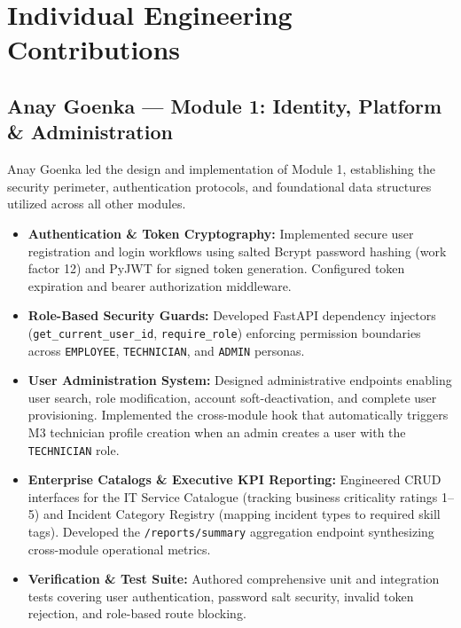 \documentclass[11pt,a4paper,oneside]{report}
\begin{document}
\section{Individual Engineering Contributions}
\label{sec:team_contributions}

\subsection{Anay Goenka --- Module 1: Identity, Platform \& Administration}
\label{subsec:contrib_anay}
Anay Goenka led the design and implementation of Module 1, establishing the security perimeter, authentication protocols, and foundational data structures utilized across all other modules.
\begin{itemize}
    \item \textbf{Authentication \& Token Cryptography:} Implemented secure user registration and login workflows using salted Bcrypt password hashing (work factor 12) and PyJWT for signed token generation. Configured token expiration and bearer authorization middleware.
    \item \textbf{Role-Based Security Guards:} Developed FastAPI dependency injectors (\texttt{get\_current\_user\_id}, \texttt{require\_role}) enforcing permission boundaries across \texttt{EMPLOYEE}, \texttt{TECHNICIAN}, and \texttt{ADMIN} personas.
    \item \textbf{User Administration System:} Designed administrative endpoints enabling user search, role modification, account soft-deactivation, and complete user provisioning. Implemented the cross-module hook that automatically triggers M3 technician profile creation when an admin creates a user with the \texttt{TECHNICIAN} role.
    \item \textbf{Enterprise Catalogs \& Executive KPI Reporting:} Engineered CRUD interfaces for the IT Service Catalogue (tracking business criticality ratings 1--5) and Incident Category Registry (mapping incident types to required skill tags). Developed the \texttt{/reports/summary} aggregation endpoint synthesizing cross-module operational metrics.
    \item \textbf{Verification \& Test Suite:} Authored comprehensive unit and integration tests covering user authentication, password salt security, invalid token rejection, and role-based route blocking.
\end{itemize}
\end{document}
